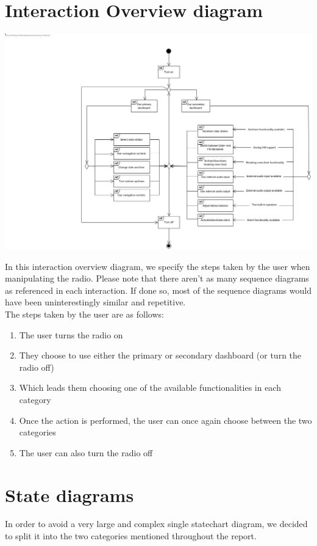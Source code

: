 \documentclass[11pt]{article}
\begin{document}
\pagebreak
\section{Interaction Overview diagram}
\vspace{10px}
\begin{center}
\includegraphics[width=16.5cm]{../Diagrams/InteractionOverview-v2.jpg}\\
\end{center}
In this interaction overview diagram, we specify the steps taken by the user when manipulating the radio. Please note that there aren't as many sequence diagrams as referenced in each interaction. If done so, most of the sequence diagrams would have been uninterestingly similar and repetitive.\\
The steps taken by the user are as follows:
\begin{enumerate}
\item The user turns the radio on
\item They choose to use either the primary or secondary dashboard (or turn the radio off)
\item Which leads them choosing one of the available functionalities in each category
\item Once the action is performed, the user can once again choose between the two categories
\item The user can also turn the radio off
\end{enumerate}

\pagebreak
\section{State diagrams}
In order to avoid a very large and complex single statechart diagram, we decided to split it into the two categories mentioned throughout the report.
\end{document}
